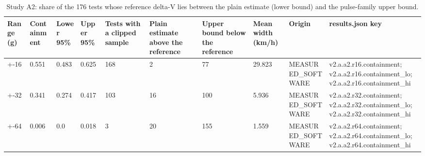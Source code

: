 \begin{table}[t]
\centering
\small
\caption{Study A2: share of the 176 tests whose reference delta-V lies between the plain estimate (lower bound) and the pulse-family upper bound.}
\label{tab:v2_tab_bounds}
\begin{tabular}{llllllllll}
\toprule
Range (g) & Containment & Lower 95\% & Upper 95\% & Tests with a clipped sample & Plain estimate above the reference & Upper bound below the reference & Mean width (km/h) & Origin & results.json key \\
\midrule
+-16 & 0.551 & 0.483 & 0.625 & 168 & 2 & 77 & 29.823 & MEASURED\_SOFTWARE & v2.a.a2.r16.containment; v2.a.a2.r16.containment\_lo; v2.a.a2.r16.containment\_hi \\
+-32 & 0.341 & 0.274 & 0.417 & 103 & 16 & 100 & 5.936 & MEASURED\_SOFTWARE & v2.a.a2.r32.containment; v2.a.a2.r32.containment\_lo; v2.a.a2.r32.containment\_hi \\
+-64 & 0.006 & 0.0 & 0.018 & 3 & 20 & 155 & 1.559 & MEASURED\_SOFTWARE & v2.a.a2.r64.containment; v2.a.a2.r64.containment\_lo; v2.a.a2.r64.containment\_hi \\
\bottomrule
\end{tabular}
\end{table}
